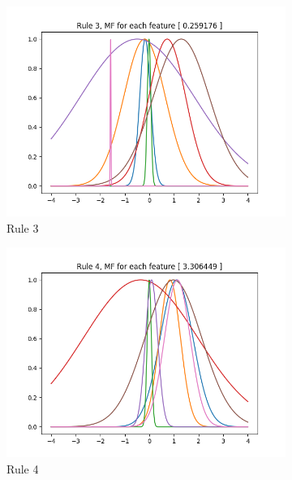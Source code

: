 \documentclass[11pt,a4paper]{article}
\begin{document}
\begin{figure}[htbp]
\begin{subfigure}{\columnwidth}
  \includegraphics[width=\columnwidth,keepaspectratio]{rule-3.png}  
  \caption{Rule 3}
  \label{fig:rules:rule-3}
\end{subfigure}
\begin{subfigure}{\columnwidth}
  \centering
  \includegraphics[width=\columnwidth,keepaspectratio]{rule-4.png}
  \caption{Rule 4}
  \label{fig:rules:rule-4}
\end{subfigure}
\begin{subfigure}{\columnwidth}
  \centering

\end{subfigure}
\end{figure}
\end{document}
